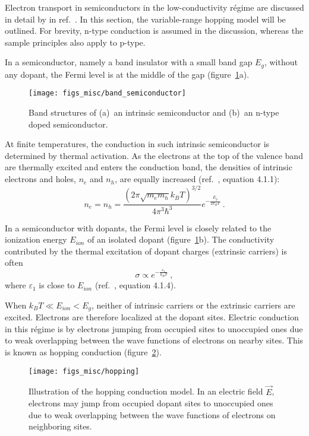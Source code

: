 Electron transport in semiconductors in the low-conductivity r\'egime are discussed in detail by \citeauthor{schklovskii_efros} in ref.~\cite{schklovskii_efros}. In this section, the variable-range hopping model will be outlined. For brevity, n-type conduction is assumed in the discussion, whereas the sample principles also apply to p-type.

In a semiconductor, namely a band insulator with a small band gap $E_g$, without any dopant, the Fermi level is at the middle of the gap (figure~\ref{fig:band_semiconductor}a). %
\begin{figure}[ht]%
    \centering%
    \texttt{[image: figs\_misc/band\_semiconductor]}%
    \caption[Band structures of an intrinsic semiconductor and an n-type doped semiconductor]{\label{fig:band_semiconductor}Band structures of (a)~an intrinsic semiconductor and (b)~an n-type doped semiconductor.}%
\end{figure}%
%
At finite temperatures, the conduction in such intrinsic semiconductor is determined by thermal activation. As the electrons at the top of the valence band are thermally excited and enters the conduction band, the densities of intrinsic electrons and holes, $n_e$ and $n_h$, are equally increased (ref.~\cite{schklovskii_efros}, equation 4.1.1):%
\begin{equation}
    n_e = n_h = \frac{\left(2\pi\sqrt{m_e m_h}k_B T\right)^{3/2}}{4\pi^3\hbar^3}e^{-\frac{E_g}{2 k_B T}}~.
\end{equation}

In a semiconductor with dopants, the Fermi level is closely related to the ionization energy $E_{ion}$ of an isolated dopant (figure~\ref{fig:band_semiconductor}b). The conductivity contributed by the thermal excitation of dopant charges (extrinsic carriers) is often%
\begin{equation}
    \sigma \propto e^{-\frac{\varepsilon_1}{k_B T}}~,\label{eq:activation}
\end{equation}%
where $\varepsilon_1$ is close to $E_{ion}$ (ref.~\cite{schklovskii_efros}, equation 4.1.4).

When $k_B T \ll E_{ion} < E_g$, neither of intrinsic carriers or the extrinsic carriers are excited. Electrons are therefore localized at the dopant sites. Electric conduction in this r\'egime is by electrons jumping from occupied sites to unoccupied ones due to weak overlapping between the wave functions of electrons on nearby sites. This is known as hopping conduction (figure~\ref{fig:hopping}).%
\begin{figure}[ht]%
    \centering%
    \texttt{[image: figs\_misc/hopping]}%
    \caption[Hopping conduction model]{\label{fig:hopping}Illustration of the hopping conduction model. In an electric field $\vec{E}$, electrons may jump from occupied dopant sites to unoccupied ones due to weak overlapping between the wave functions of electrons on neighboring sites.}%
\end{figure}%

